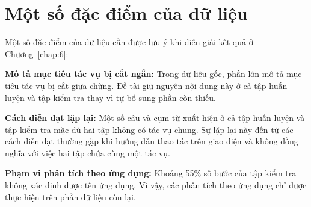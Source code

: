 \section{Một số đặc điểm của dữ liệu}\label{sec:3.6}

Một số đặc điểm của dữ liệu cần được lưu ý khi diễn giải kết quả ở Chương~\ref{chap:6}:

\textbf{Mô tả mục tiêu tác vụ bị cắt ngắn:} Trong dữ liệu gốc, phần lớn mô tả mục tiêu tác vụ bị cắt giữa chừng. Đề tài giữ nguyên nội dung này ở cả tập huấn luyện và tập kiểm tra thay vì tự bổ sung phần còn thiếu.

\textbf{Cách diễn đạt lặp lại:} Một số câu và cụm từ xuất hiện ở cả tập huấn luyện và tập kiểm tra mặc dù hai tập không có tác vụ chung. Sự lặp lại này đến từ các cách diễn đạt thường gặp khi hướng dẫn thao tác trên giao diện và không đồng nghĩa với việc hai tập chứa cùng một tác vụ.

\textbf{Phạm vi phân tích theo ứng dụng:} Khoảng 55\% số bước của tập kiểm tra không xác định được tên ứng dụng. Vì vậy, các phân tích theo ứng dụng chỉ được thực hiện trên phần dữ liệu còn lại.

